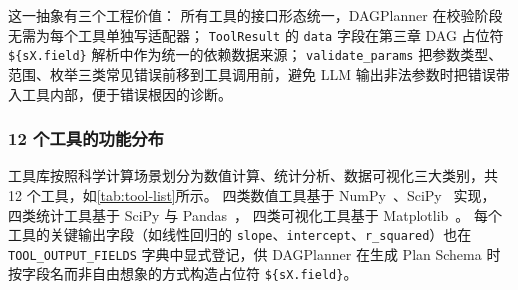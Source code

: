这一抽象有三个工程价值：
所有工具的接口形态统一，DAGPlanner 在校验阶段无需为每个工具单独写适配器；
\texttt{ToolResult} 的 \texttt{data} 字段在第三章 DAG 占位符 \verb|${sX.field}| 解析中作为统一的依赖数据来源；
\texttt{validate\_params} 把参数类型、范围、枚举三类常见错误前移到工具调用前，避免 LLM 输出非法参数时把错误带入工具内部，便于错误根因的诊断。

\subsubsection{12 个工具的功能分布}

工具库按照科学计算场景划分为数值计算、统计分析、数据可视化三大类别，共 12 个工具，如\autoref{tab:tool-list}所示。
四类数值工具基于 NumPy~\cite{harris2020numpy}、SciPy~\cite{virtanen2020scipy} 实现，
四类统计工具基于 SciPy 与 Pandas~\cite{mckinney2010pandas}，
四类可视化工具基于 Matplotlib~\cite{hunter2007matplotlib}。
每个工具的关键输出字段（如线性回归的 \texttt{slope}、\texttt{intercept}、\texttt{r\_squared}）也在 \texttt{TOOL\_OUTPUT\_FIELDS} 字典中显式登记，供 DAGPlanner 在生成 Plan Schema 时按字段名而非自由想象的方式构造占位符 \verb|${sX.field}|。

